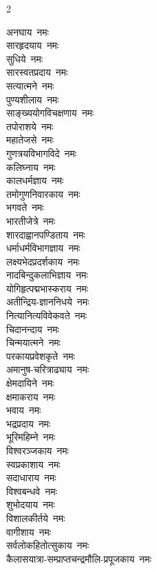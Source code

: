 \begin{multicols}{2}
\begin{flushleft}
अनघाय~नमः\\
सारहृदयाय~नमः\\
सुधिये~नमः\\
सारस्वतप्रदाय~नमः\\
सत्यात्मने~नमः\\
पुण्यशीलाय~नमः\\
साङ्ख्ययोगविचक्षणाय~नमः\\
तपोराशये~नमः\\
महातेजसे~नमः\\
गुणत्रयविभागविदे~नमः\hfill{}\\
                                        
कलिघ्नाय~नमः\\
कालधर्मज्ञाय~नमः\\
तमोगुणनिवारकाय~नमः\\
भगवते~नमः\\
भारतीजेत्रे~नमः\\
शारदाह्वानपण्डिताय~नमः\\
धर्माधर्मविभागज्ञाय~नमः\\
लक्ष्यभेदप्रदर्शकाय~नमः\\
नादबिन्दुकलाभिज्ञाय~नमः\\
योगिहृत्पद्मभास्कराय~नमः\hfill{}\\
                                        
अतीन्द्रिय-ज्ञाननिधये~नमः\\
नित्यानित्यविवेकवते~नमः\\
चिदानन्दाय~नमः\\
चिन्मयात्मने~नमः\\
परकायप्रवेशकृते~नमः\\
अमानुष-चरित्राढ्याय~नमः\\
क्षेमदायिने~नमः\\
क्षमाकराय~नमः\\
भवाय~नमः\\
भद्रप्रदाय~नमः\hfill{}\\
                                        
भूरिमहिम्ने~नमः\\
विश्वरञ्जकाय~नमः\\
स्वप्रकाशाय~नमः\\
सदाधाराय~नमः\\
विश्वबन्धवे~नमः\\
शुभोदयाय~नमः\\
विशालकीर्तये~नमः\\
वागीशाय~नमः\\
सर्वलोकहितोत्सुकाय~नमः\\
कैलासयात्रा-सम्प्राप्त\-चन्द्र\-मौलि-प्रपूजकाय~\mbox{नमः\hfill~}\\
                                        

\end{flushleft}
\end{multicols}
